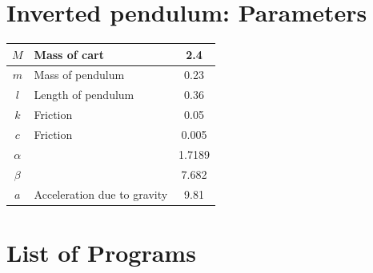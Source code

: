 \documentclass[12pt]{article}
\begin{document}

\section{Inverted pendulum: Parameters}


\begin{center}
\begin{tabular}{|c|l|c|}
\hline
$M$ & Mass of cart &  2.4  \\
\hline
$m$ & Mass of pendulum &  0.23 \\
\hline
$l$ & Length of pendulum & 0.36 \\
\hline
$k$ & Friction & 0.05 \\
\hline
$c$ & Friction & 0.005 \\
\hline
$\alpha$ &  & 1.7189 \\
\hline
$\beta$ &  &  7.682 \\
\hline
$a$ & Acceleration due to gravity & 9.81 \\
\hline
\end{tabular}
\end{center}

\section{List of Programs}
\end{document}
